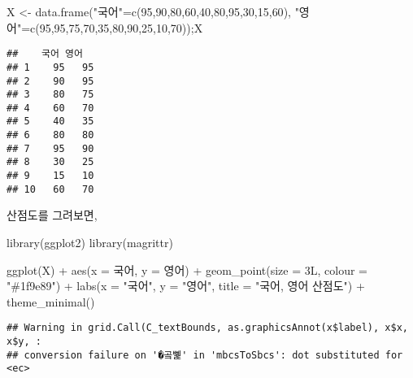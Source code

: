 \documentclass[
]{article}
\newenvironment{Shaded}{\begin{snugshade}}{\end{snugshade}}
\newcommand{\AttributeTok}[1]{\textcolor[rgb]{0.77,0.63,0.00}{#1}}
\newcommand{\DecValTok}[1]{\textcolor[rgb]{0.00,0.00,0.81}{#1}}
\newcommand{\FunctionTok}[1]{\textcolor[rgb]{0.00,0.00,0.00}{#1}}
\newcommand{\NormalTok}[1]{#1}
\newcommand{\OtherTok}[1]{\textcolor[rgb]{0.56,0.35,0.01}{#1}}
\newcommand{\SpecialCharTok}[1]{\textcolor[rgb]{0.00,0.00,0.00}{#1}}
\newcommand{\StringTok}[1]{\textcolor[rgb]{0.31,0.60,0.02}{#1}}
\begin{document}
\begin{Shaded}
\begin{Highlighting}[]
\NormalTok{X }\OtherTok{\textless{}{-}} \FunctionTok{data.frame}\NormalTok{(}\StringTok{"국어"}\OtherTok{=}\FunctionTok{c}\NormalTok{(}\DecValTok{95}\NormalTok{,}\DecValTok{90}\NormalTok{,}\DecValTok{80}\NormalTok{,}\DecValTok{60}\NormalTok{,}\DecValTok{40}\NormalTok{,}\DecValTok{80}\NormalTok{,}\DecValTok{95}\NormalTok{,}\DecValTok{30}\NormalTok{,}\DecValTok{15}\NormalTok{,}\DecValTok{60}\NormalTok{), }\StringTok{"영어"}\OtherTok{=}\FunctionTok{c}\NormalTok{(}\DecValTok{95}\NormalTok{,}\DecValTok{95}\NormalTok{,}\DecValTok{75}\NormalTok{,}\DecValTok{70}\NormalTok{,}\DecValTok{35}\NormalTok{,}\DecValTok{80}\NormalTok{,}\DecValTok{90}\NormalTok{,}\DecValTok{25}\NormalTok{,}\DecValTok{10}\NormalTok{,}\DecValTok{70}\NormalTok{));X}
\end{Highlighting}
\end{Shaded}

\begin{verbatim}
##    국어 영어
## 1    95   95
## 2    90   95
## 3    80   75
## 4    60   70
## 5    40   35
## 6    80   80
## 7    95   90
## 8    30   25
## 9    15   10
## 10   60   70
\end{verbatim}

산점도를 그려보면,

\begin{Shaded}
\begin{Highlighting}[]
\FunctionTok{library}\NormalTok{(ggplot2)}
\FunctionTok{library}\NormalTok{(magrittr)}

 \FunctionTok{ggplot}\NormalTok{(X) }\SpecialCharTok{+}
 \FunctionTok{aes}\NormalTok{(}\AttributeTok{x =}\NormalTok{ 국어, }\AttributeTok{y =}\NormalTok{ 영어) }\SpecialCharTok{+}
 \FunctionTok{geom\_point}\NormalTok{(}\AttributeTok{size =}\NormalTok{ 3L, }\AttributeTok{colour =} \StringTok{"\#1f9e89"}\NormalTok{) }\SpecialCharTok{+}
 \FunctionTok{labs}\NormalTok{(}\AttributeTok{x =} \StringTok{"국어"}\NormalTok{, }\AttributeTok{y =} \StringTok{"영어"}\NormalTok{, }\AttributeTok{title =} \StringTok{"국어, 영어 산점도"}\NormalTok{) }\SpecialCharTok{+}
 \FunctionTok{theme\_minimal}\NormalTok{()}
\end{Highlighting}
\end{Shaded}

\begin{verbatim}
## Warning in grid.Call(C_textBounds, as.graphicsAnnot(x$label), x$x, x$y, :
## conversion failure on '�곸뼱' in 'mbcsToSbcs': dot substituted for <ec>
\end{verbatim}
\end{document}
